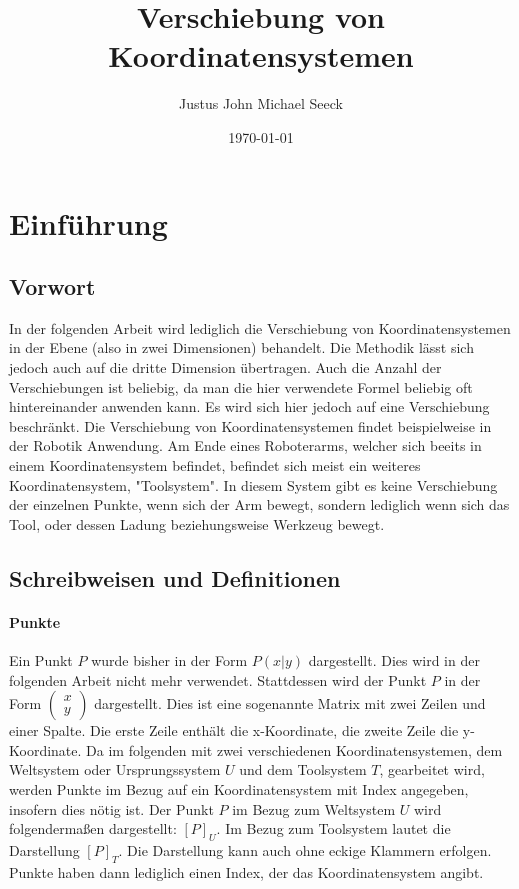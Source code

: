 \documentclass{article}
\title{Verschiebung von Koordinatensystemen}
\author{Justus John Michael Seeck}
\date{\today}
\newcommand{\m}[1]{\begin{pmatrix}#1\end{pmatrix}}
\begin{document}
    \maketitle

    \tableofcontents

    \newpage

    \section{Einführung}

    \subsection{Vorwort}

    In der folgenden Arbeit wird lediglich die Verschiebung von Koordinatensystemen in der Ebene (also in zwei Dimensionen) behandelt.
    Die Methodik lässt sich jedoch auch auf die dritte Dimension übertragen. Auch die Anzahl der Verschiebungen ist
    beliebig, da man die
    hier verwendete Formel beliebig oft hintereinander anwenden kann. Es wird sich hier jedoch auf eine Verschiebung beschränkt.
    Die Verschiebung von Koordinatensystemen findet beispielweise in der Robotik Anwendung. Am Ende eines Roboterarms,
    welcher sich beeits in einem Koordinatensystem befindet,
    befindet sich meist ein weiteres Koordinatensystem,
    "Toolsystem". In diesem System gibt es keine Verschiebung der einzelnen Punkte, wenn sich der Arm bewegt,
    sondern lediglich wenn sich das Tool, oder dessen Ladung beziehungsweise Werkzeug bewegt.

    \subsection{Schreibweisen und Definitionen}
    
    \paragraph{Punkte}

    Ein Punkt $P$ wurde bisher in der Form $P(x|y)$ dargestellt. Dies wird in der folgenden Arbeit nicht mehr verwendet. Stattdessen wird
    der Punkt $P$ in der Form $\m{x \\ y}$ dargestellt. Dies ist eine sogenannte Matrix mit zwei Zeilen und einer Spalte.
    Die erste Zeile enthält die x-Koordinate, die zweite Zeile die y-Koordinate.
    Da im folgenden mit zwei verschiedenen Koordinatensystemen, dem Weltsystem oder Ursprungssystem $U$
    und dem Toolsystem $T$, gearbeitet wird,
    werden Punkte im Bezug auf ein Koordinatensystem mit Index angegeben, insofern dies nötig ist.
    Der Punkt $P$ im Bezug zum Weltsystem $U$ wird
    folgendermaßen dargestellt: ${[P]}_{U}$.
    Im Bezug zum Toolsystem lautet die Darstellung ${[P]}_{T}$.
    Die Darstellung kann auch ohne eckige Klammern erfolgen.
    Punkte haben dann lediglich einen Index, der das Koordinatensystem angibt.
    
\end{document}
